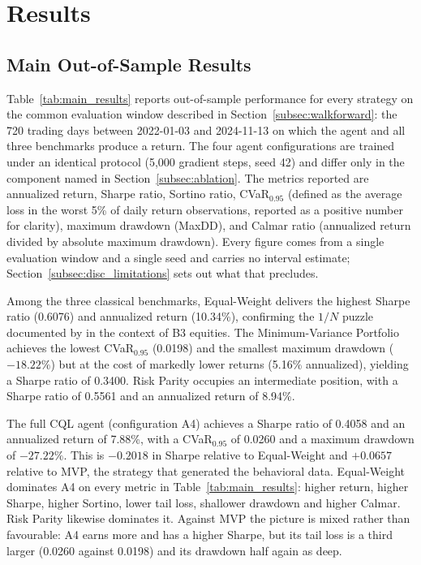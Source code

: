 \section{Results}
\label{sec:results}

\subsection{Main Out-of-Sample Results}
\label{subsec:results_main}

Table~\ref{tab:main_results} reports out-of-sample performance for every
strategy on the common evaluation window described in
Section~\ref{subsec:walkforward}: the 720 trading days between 2022-01-03 and
2024-11-13 on which the agent and all three benchmarks produce a return.
The four agent configurations are trained under an identical protocol
(5{,}000 gradient steps, seed 42) and differ only in the component named in
Section~\ref{subsec:ablation}.
The metrics reported are annualized return, Sharpe ratio, Sortino ratio,
CVaR$_{0.95}$ (defined as the average loss in the worst 5\% of daily return
observations, reported as a positive number for clarity), maximum drawdown (MaxDD),
and Calmar ratio (annualized return divided by absolute maximum drawdown).
Every figure comes from a single evaluation window and a single seed and carries
no interval estimate; Section~\ref{subsec:disc_limitations} sets out what that
precludes.

Among the three classical benchmarks, Equal-Weight delivers the highest Sharpe
ratio (0.6076) and annualized return (10.34\%), confirming the $1/N$ puzzle
documented by \citet{DeMiguel2007} in the context of B3 equities.
The Minimum-Variance Portfolio achieves the lowest CVaR$_{0.95}$ (0.0198) and the
smallest maximum drawdown ($-18.22\%$) but at the cost of markedly lower returns
(5.16\% annualized), yielding a Sharpe ratio of 0.3400.
Risk Parity occupies an intermediate position, with a Sharpe ratio of 0.5561 and
an annualized return of 8.94\%.

The full CQL agent (configuration A4) achieves a Sharpe ratio of 0.4058 and an
annualized return of 7.88\%, with a CVaR$_{0.95}$ of 0.0260 and a maximum
drawdown of $-27.22\%$.
This is $-0.2018$ in Sharpe relative to Equal-Weight and $+0.0657$ relative to
MVP, the strategy that generated the behavioral data.
Equal-Weight dominates A4 on every metric in Table~\ref{tab:main_results}:
higher return, higher Sharpe, higher Sortino, lower tail loss, shallower drawdown
and higher Calmar.
Risk Parity likewise dominates it.
Against MVP the picture is mixed rather than favourable: A4 earns more and has a
higher Sharpe, but its tail loss is a third larger (0.0260 against 0.0198) and its
drawdown half again as deep.

